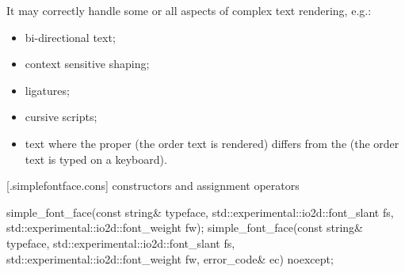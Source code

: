 \pnum
It may correctly handle some or all aspects of complex text rendering, e.g.:
\begin{itemize}
	\item bi-directional text;
	\item context sensitive shaping;
	\item ligatures;
	\item cursive scripts;
	\item text where the proper  (the order text is rendered) differs from the  (the order text is typed on a keyboard).
\end{itemize}

 [\iotwod.simplefontface.cons] { constructors and 
assignment operators}

\begin{itemdecl}
    simple_font_face(const string& typeface,
      std::experimental::io2d::font_slant fs,
      std::experimental::io2d::font_weight fw);
    simple_font_face(const string& typeface,
      std::experimental::io2d::font_slant fs,
      std::experimental::io2d::font_weight fw, error_code& ec) noexcept;
\end{itemdecl}
